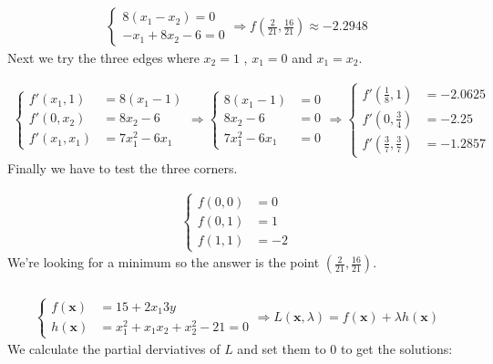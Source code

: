 \documentclass{article}
\begin{document}
\begin{align*}
  \begin{cases}
    8 (x_1 - x_2)     = 0 \\
    - x_1 + 8 x_2 - 6 = 0
  \end{cases}
  \Rightarrow f\left(\frac{2}{21}, \frac{16}{21} \right) \approx -2.2948
\end{align*}
Next we try the three edges where $x_2 = 1$ , $ x_1 = 0$ and $ x_1 = x_2$.

\begin{align*}
  \begin{cases}
    f'(x_1, 1)   &= 8 (x_1 - 1) \\
    f'(0, x_2)   &= 8 x_2 - 6 \\
    f'(x_1, x_1) &= 7 x_1^2 - 6x_1
  \end{cases}
  \Rightarrow
  \begin{cases}
    8 (x_1 - 1) &= 0 \\
    8 x_2 - 6   &= 0 \\
    7 x_1^2 - 6x_1  &= 0
  \end{cases}
  \Rightarrow
  \begin{cases}
    f'\left(\frac{1}{8}, 1 \right)           &= -2.0625 \\
    f'\left(0, \frac{3}{4} \right)           &= -2.25   \\
    f'\left(\frac{3}{7}, \frac{3}{7} \right) &= -1.2857
  \end{cases}
\end{align*}
Finally we have to test the three corners.

\begin{align*}
  \begin{cases}
    f(0,0) &= 0 \\
    f(0,1) &= 1 \\
    f(1,1) &= -2
  \end{cases}
\end{align*}
We're looking for a minimum so the answer is the point $\left(\frac{2}{21}, \frac{16}{21} \right)$.

\subsubsection{}

\begin{align*}
  \begin{cases}
    f(\mathbf{x}) &= 15 + 2x_1  3y \\
    h(\mathbf{x}) &= x_1^2 + x_1x_2 + x_2^2 - 21 = 0
  \end{cases}
  \Rightarrow
  L(\mathbf{x}, \lambda) = f(\mathbf{x}) + \lambda h(\mathbf{x})
\end{align*}
We calculate the partial derviatives of $L$ and set them to $0$ to get the solutions:
\end{document}
